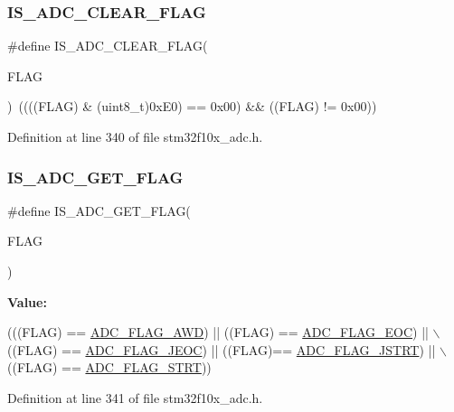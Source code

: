 \subsubsection{\texorpdfstring{I\+S\+\_\+\+A\+D\+C\+\_\+\+C\+L\+E\+A\+R\+\_\+\+F\+L\+AG}{IS\_ADC\_CLEAR\_FLAG}}
{\footnotesize\ttfamily \#define I\+S\+\_\+\+A\+D\+C\+\_\+\+C\+L\+E\+A\+R\+\_\+\+F\+L\+AG(\begin{DoxyParamCaption}\item[{}]{F\+L\+AG }\end{DoxyParamCaption})~((((F\+L\+AG) \& (uint8\+\_\+t)0x\+E0) == 0x00) \&\& ((\+F\+L\+A\+G) != 0x00))}



Definition at line 340 of file stm32f10x\+\_\+adc.\+h.

\mbox{\label{group___a_d_c__flags__definition_ga597eb68dfef9dbe0928ed14a1aedc710}} 
\subsubsection{\texorpdfstring{I\+S\+\_\+\+A\+D\+C\+\_\+\+G\+E\+T\+\_\+\+F\+L\+AG}{IS\_ADC\_GET\_FLAG}}
{\footnotesize\ttfamily \#define I\+S\+\_\+\+A\+D\+C\+\_\+\+G\+E\+T\+\_\+\+F\+L\+AG(\begin{DoxyParamCaption}\item[{}]{F\+L\+AG }\end{DoxyParamCaption})}

{\bfseries Value\+:}
\begin{DoxyCode}
(((FLAG) == \hyperlink{group___a_d_c__flags__definition_gadb75a4b430fb84950232b7a8f3a6a877}{ADC\_FLAG\_AWD}) || ((FLAG) == \hyperlink{group___a_d_c__flags__definition_gaf2c6fdf7e9ab63b778149e5fb56413d4}{ADC\_FLAG\_EOC}) || \(\backslash\)
                               ((FLAG) == \hyperlink{group___a_d_c__flags__definition_ga4df8eea8ab83d98104ee15a339743a4e}{ADC\_FLAG\_JEOC}) || ((FLAG)== 
      \hyperlink{group___a_d_c__flags__definition_ga278f4e866f4322c1120bf0db5301c432}{ADC\_FLAG\_JSTRT}) || \(\backslash\)
                               ((FLAG) == \hyperlink{group___a_d_c__flags__definition_gad0c59ae7749c69b5b91f2c533db1b619}{ADC\_FLAG\_STRT}))
\end{DoxyCode}


Definition at line 341 of file stm32f10x\+\_\+adc.\+h.

